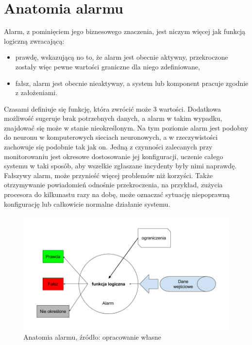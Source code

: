\section{Anatomia alarmu}
\label{chapter:monitoring:anatomy_of_alarm}

    Alarm, z pominięciem jego biznesowego znaczenia, jest niczym więcej jak funkcją logiczną zwracającą:
    \begin{itemize}
        \item prawdę, wskazującą no to, że alarm jest obecnie aktywny, przekroczone zostały więc
        pewne wartości graniczne dla niego zdefiniowane,
        \item fałsz, alarm jest obecnie nieaktywny, a system lub komponent pracuje zgodnie z założeniami.
    \end{itemize}
    Czasami definiuje się funkcję, która zwrócić może 3 wartości. Dodatkowa możliwość sugeruje brak 
    potrzebnych danych, a alarm w takim wypadku, znajdować się może w stanie nieokreślonym. Na tym poziomie alarm
    jest podobny do neuronu w komputerowych sieciach neuronowych, a w rzeczywistości zachowuje się podobnie tak jak on.
    Jedną z czynności zalecanych przy monitorowaniu jest okresowe dostosowanie jej konfiguracji, uczenie całego
    systemu w taki sposób, aby wszelkie zgłaszane incydenty były nimi naprawdę. Fałszywy alarm, może
    przynieść więcej problemów niż korzyści. Także otrzymywanie powiadomień odnośnie przekroczenia, na przykład, zużycia
    procesora do kilkunastu razy na dobę, może oznaczać sytuację niepoprawną konfigurację
    lub całkowicie normalne działanie systemu.
    
    \begin{figure}[H]
        \centering
        \includegraphics[width=1.0\textwidth]{images/alarm_anatomy}
        \caption[Anatomia alarmu]{Anatomia alarmu, źródło: {opracowanie własne}}
        \label{chapter:monitoring:anatomy_of_alarm:picture}
    \end{figure}
   

